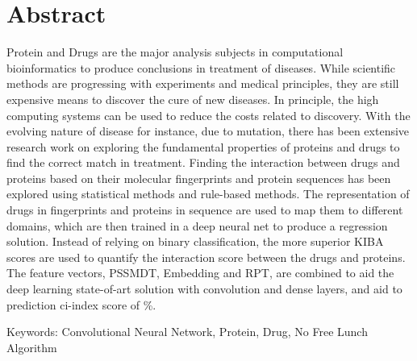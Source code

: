 

\chapter*{Abstract} 
\doublespacing
Protein and Drugs are the major analysis subjects in computational bioinformatics to produce conclusions in treatment of diseases. While scientific methods are progressing with experiments and medical principles, they are still expensive means to discover the cure of new diseases. In principle, the high computing systems can be used to reduce the costs related to discovery. With the evolving nature of disease for instance, due to mutation, there has been extensive research work on exploring the fundamental properties of proteins and drugs to find the correct match in treatment. Finding the interaction between drugs and proteins based on their molecular fingerprints and protein sequences has been explored using statistical methods and rule-based methods. The representation of drugs in fingerprints and proteins in sequence are used to map them to different domains, which are then trained in a deep neural net to produce a regression solution. Instead of relying on binary classification, the more superior KIBA scores are used to quantify the interaction score between the drugs and proteins. The feature vectors, PSSMDT, Embedding and RPT, are combined to aid the deep learning state-of-art solution with convolution and dense layers, and aid to prediction ci-index score of \%.

Keywords: Convolutional Neural Network, Protein, Drug, No Free Lunch Algorithm